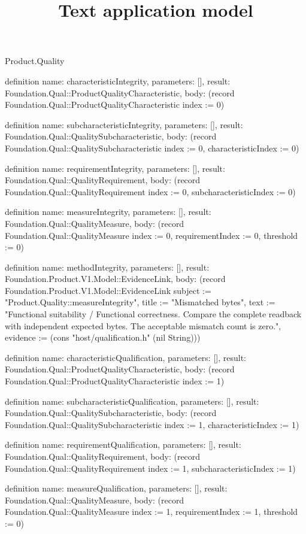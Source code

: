 \begin{lexlean}{Product.Quality}
\title{Text application model}
\begin{semanticmodule}
definition{
  name: characteristicIntegrity, parameters: [], result: Foundation.Qual::ProductQualityCharacteristic,
  body: (record Foundation.Qual::ProductQualityCharacteristic {index := 0})
}

definition{
  name: subcharacteristicIntegrity, parameters: [], result: Foundation.Qual::QualitySubcharacteristic,
  body: (record Foundation.Qual::QualitySubcharacteristic {index := 0, characteristicIndex := 0})
}

definition{
  name: requirementIntegrity, parameters: [], result: Foundation.Qual::QualityRequirement,
  body: (record Foundation.Qual::QualityRequirement {index := 0, subcharacteristicIndex := 0})
}

definition{
  name: measureIntegrity, parameters: [], result: Foundation.Qual::QualityMeasure,
  body: (record Foundation.Qual::QualityMeasure {index := 0, requirementIndex := 0, threshold := 0})
}

definition{
  name: methodIntegrity, parameters: [], result: Foundation.Product.V1.Model::EvidenceLink,
  body: (record Foundation.Product.V1.Model::EvidenceLink {subject := "Product.Quality::measureIntegrity", title := "Mismatched bytes", text := "Functional suitability / Functional correctness. Compare the complete readback with independent expected bytes. The acceptable mismatch count is zero.", evidence := (cons "host/qualification.h" (nil String))})
}

definition{
  name: characteristicQualification, parameters: [], result: Foundation.Qual::ProductQualityCharacteristic,
  body: (record Foundation.Qual::ProductQualityCharacteristic {index := 1})
}

definition{
  name: subcharacteristicQualification, parameters: [], result: Foundation.Qual::QualitySubcharacteristic,
  body: (record Foundation.Qual::QualitySubcharacteristic {index := 1, characteristicIndex := 1})
}

definition{
  name: requirementQualification, parameters: [], result: Foundation.Qual::QualityRequirement,
  body: (record Foundation.Qual::QualityRequirement {index := 1, subcharacteristicIndex := 1})
}

definition{
  name: measureQualification, parameters: [], result: Foundation.Qual::QualityMeasure,
  body: (record Foundation.Qual::QualityMeasure {index := 1, requirementIndex := 1, threshold := 0})
}


\end{semanticmodule}
\end{lexlean}
